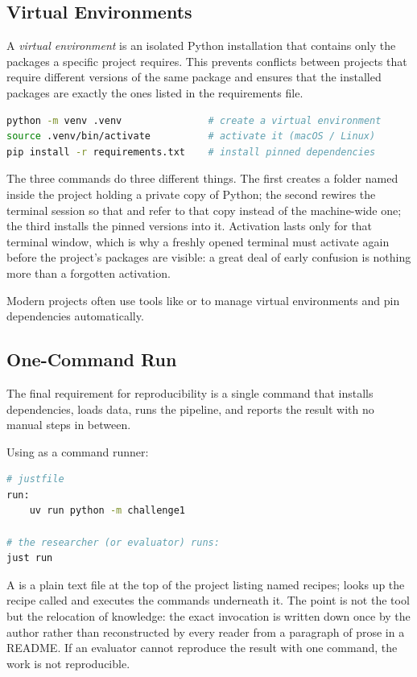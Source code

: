 \subsection{Virtual Environments}

A \emph{virtual environment} is an isolated Python installation that contains only the packages a specific project requires.
This prevents conflicts between projects that require different versions of the same package and ensures that the installed packages are exactly the ones listed in the requirements file.

\begin{lstlisting}[language=bash]
python -m venv .venv               # create a virtual environment
source .venv/bin/activate          # activate it (macOS / Linux)
pip install -r requirements.txt    # install pinned dependencies
\end{lstlisting}

The three commands do three different things.
The first creates a folder named  inside the project holding a private copy of Python;
the second rewires the terminal session so that  and  refer to that copy instead of the machine-wide one;
the third installs the pinned versions into it.
Activation lasts only for that terminal window, which is why a freshly opened terminal must activate again before the project's packages are visible: a great deal of early confusion is nothing more than a forgotten activation.

Modern projects often use tools like  or  to manage virtual environments and pin dependencies automatically.

\subsection{One-Command Run}

The final requirement for reproducibility is a single command that installs dependencies, loads data, runs the pipeline, and reports the result with no manual steps in between.

\begin{example}
Using  as a command runner:
\begin{lstlisting}[language=bash]
# justfile
run:
    uv run python -m challenge1

# the researcher (or evaluator) runs:
just run
\end{lstlisting}
A  is a plain text file at the top of the project listing named recipes;  looks up the recipe called  and executes the commands underneath it.
The point is not the tool but the relocation of knowledge: the exact invocation is written down once by the author rather than reconstructed by every reader from a paragraph of prose in a README.
If an evaluator cannot reproduce the result with one command, the work is not reproducible.
\end{example}

